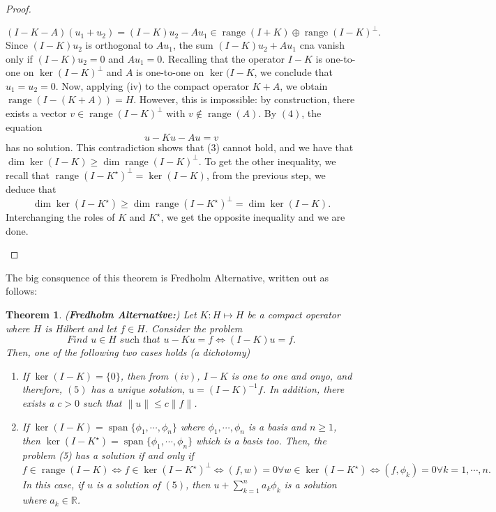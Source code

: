 \documentclass[12pt]{article}
\newtheorem{theorem}{Theorem}
\newcommand{\R}{{\mathbb R}}
\DeclareMathOperator{\range}{range}
\newcommand{\Ks}{K^{\star}}
\DeclareMathOperator*{\spa}{span}
\begin{document}
\begin{proof}
\begin{enumerate}
\begin{equation}
(I - K - A)(u_1 + u_2) = (I - K) u_2 - A u_1 \in \range(I + K) \oplus \range(I - K)^{\perp}.
\end{equation}
Since $(I - K)u_2$ is orthogonal to $A u_1$, the sum $(I - K)u_2 + A u_1$ cna vanish only if $(I - K) u_2 = 0$ and $A u_1 = 0$. Recalling that the operator $I -K$ is one-to-one on $\ker(I -K)^{\perp}$ and $A$ is one-to-one on $\ker(I - K$, we conclude that $u_1 = u_2 = 0$. Now, applying (iv) to the compact operator $K + A$, we obtain $\range(I - (K + A)) = H$. However, this is impossible: by construction, there exists a vector $v \in \range(I - K)^{\perp}$ with $v \not\in \range(A)$. By $(4)$, the equation
\[ u - Ku - Au = v\]
has no solution. This contradiction shows that (3) cannot hold, and we have that $\dim \ker(I - K) \geq \dim \range(I - K)^{\perp}$. To get the other inequality, we recall that $\range(I - \Ks)^{\perp} = \ker(I - K)$, from the previous step, we deduce that 
\[ \dim \ker(I - \Ks) \geq \dim \range(I - \Ks)^{\perp} = \dim\ker(I - K). \]
Interchanging the roles of $K$ and $\Ks$, we get the opposite inequality and we are done. 
\end{enumerate}
\end{proof}
\vspace{-20pt}
The big consquence of this theorem is Fredholm Alternative, written out as follows: 
\begin{theorem}(\textbf{Fredholm Alternative:}) Let $K: H \mapsto H$ be a compact operator where $H$ is Hilbert and let $f \in H$. Consider the problem 
\begin{equation}
\textit{Find $u \in H$ such that $u - Ku = f \Longleftrightarrow (I - K)u = f$}.
\end{equation}
Then, one of the following two cases holds (a dichotomy)
\begin{enumerate}[topsep=-15pt]
\item[1)] If $\ker(I - K) = \{ 0 \}$, then from $(iv)$, $I - K$ is one to one and onyo, and therefore, $(5)$ has a unique solution, $u = (I - K)^{-1} f$. In addition, there exists a $c > 0$ such that $ \| u \| \leq c \|f \|$. 
\item[2)] If $\ker(I - K) = \spa \{ \phi_1, \cdots, \phi_n \}$ where $\phi_1, \cdots, \phi_n$ is a basis and $n \geq 1$, then $\ker(I - \Ks) = \spa\{ \phi_1, \cdots, \phi_n \}$ which is a basis too. Then, the problem (5) has a solution if and only if
\[ f \in \range(I - K) \Leftrightarrow f \in \ker(I - \Ks)^{\perp} \Leftrightarrow (f, w) = 0  \forall w \in \ker(I - \Ks) \Leftrightarrow (f, \phi_k) = 0 \forall k = 1, \cdots, n.\]
In this case, if $u$ is a solution of $(5)$, then $u + \sum\limits_{ k = 1}^n a_k \phi_k$ is a solution where $a_k \in \R$. 
\end{enumerate}
\end{theorem} 
\end{document}
